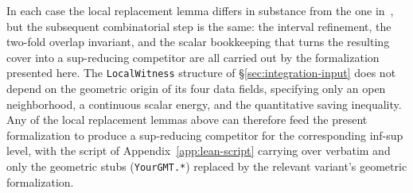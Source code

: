 In each case the local replacement lemma differs in substance
from the one in~\cite{DLT13}, but the subsequent combinatorial
step is the same: the interval refinement, the two-fold
overlap invariant, and the scalar bookkeeping that turns the
resulting cover into a sup-reducing competitor are all carried
out by the formalization presented here. The
\texttt{LocalWitness} structure of \S\ref{sec:integration-input}
does not depend on the geometric origin of its four data fields,
specifying only an open neighborhood, a continuous scalar
energy, and the quantitative saving inequality. Any of the
local replacement lemmas above can therefore feed the present
formalization to produce a sup-reducing competitor for the
corresponding inf-sup level, with the script of
Appendix~\ref{app:lean-script} carrying over verbatim and only
the geometric stubs (\texttt{YourGMT.*}) replaced by the
relevant variant's geometric formalization.

